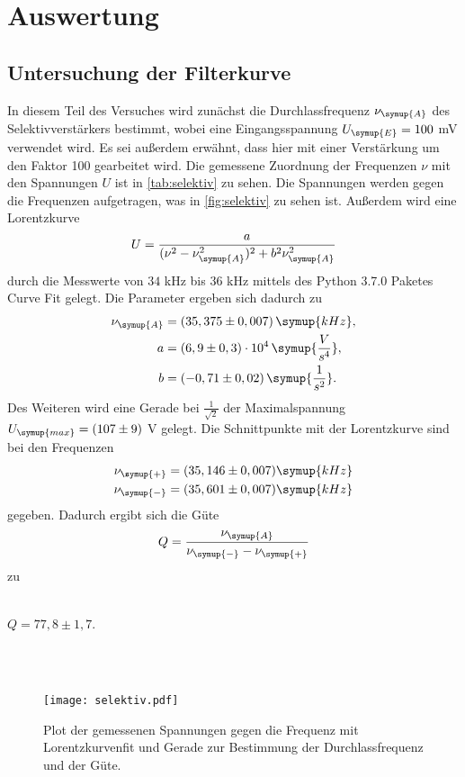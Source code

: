 \section{Auswertung}
\label{sec:Auswertung}
    \subsection{Untersuchung der Filterkurve}
    In diesem Teil des Versuches wird zunächst die Durchlassfrequenz $\nu_{\symup{A}}$ des Selektivverstärkers bestimmt, wobei eine
    Eingangsspannung $U_{\symup{E}} = 100$ mV verwendet wird. Es sei außerdem erwähnt, dass hier mit einer Verstärkung um den Faktor 100
    gearbeitet wird. Die gemessene Zuordnung
    der Frequenzen $\nu$ mit den Spannungen $U$ ist in \autoref{tab:selektiv} zu sehen. 
    Die Spannungen werden gegen die Frequenzen aufgetragen, was in \autoref{fig:selektiv} zu sehen ist. Außerdem wird eine Lorentzkurve
    \begin{equation}
    \label{eqn:lorentz}
        U = \frac{a}{(\nu^2 - \nu_{\symup{A}}^2)^2 + b^2 \nu_{\symup{A}}^2}
    \end{equation}
    durch die Messwerte von $34$ kHz bis $36$ kHz mittels des Python 3.7.0 Paketes Curve Fit gelegt. Die Parameter ergeben sich dadurch zu 
    \begin{align*}
    \nu_{\symup{A}} &= (35,375 \pm 0,007) \, \symup{kHz}, \\
    a &= (6,9 \pm 0,3) \cdot 10^4 \, \symup{\frac{V}{s^4}}, \\
    b &= (- 0,71 \pm 0,02) \, \symup{\frac{1}{s^2}}.
    \end{align*}
    Des Weiteren wird eine Gerade bei $\frac{1}{\sqrt{2}}$ der Maximalspannung $U_{\symup{max}} = (107 \pm 9)$ V gelegt. Die Schnittpunkte mit der Lorentzkurve sind bei den
    Frequenzen
    \begin{align*}
    \nu_{\symup{+}} &= (35,146 \pm 0,007) \symup{kHz}\\
    \nu_{\symup{-}} &= (35,601 \pm 0,007) \symup{kHz}
    \end{align*} 
    gegeben. Dadurch ergibt sich die Güte
    \begin{equation}
    \label{eqn:guete}
        Q = \frac{\nu_{\symup{A}}}{\nu_{\symup{-}} - \nu_{\symup{+}}}
    \end{equation}
    zu 
    \\ \\
    \centerline{$Q = 77,8 \pm 1,7 $.}    
    \\ \\
     
    \begin{figure}
        \centering
        \texttt{[image: selektiv.pdf]}
        \caption{Plot der gemessenen Spannungen gegen die Frequenz mit Lorentzkurvenfit und Gerade zur Bestimmung der Durchlassfrequenz und der Güte.}
    \label{fig:selektiv}
    \end{figure}

